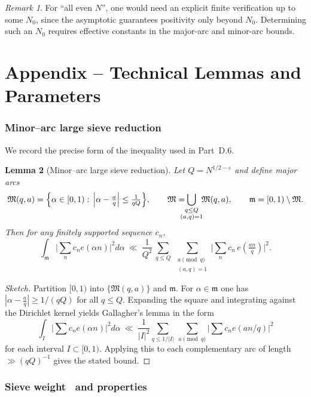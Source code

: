 \documentclass[11pt]{article}
\newtheorem{lemma}{Lemma}[part]
\theoremstyle{definition}
\theoremstyle{remark}
\newtheorem{remark}[lemma]{Remark}
\numberwithin{equation}{part}
\begin{document}
\begin{remark}
	For “all even $N$”, one would need an explicit finite verification up to some $N_0$, since the asymptotic guarantees positivity only beyond $N_0$. Determining such an $N_0$ requires effective constants in the major-arc and minor-arc bounds.
\end{remark}

\part{Appendix -- Technical Lemmas and Parameters}

\section{Minor--arc large sieve reduction}

We record the precise form of the inequality used in Part~D.6.

\begin{lemma}[Minor--arc large sieve reduction]\label{lem:largesieve-minor}
	Let $Q=N^{1/2-\varepsilon}$ and define major arcs
	\[
		\mathfrak M(q,a)=\Bigl\{\alpha\in[0,1):\,\Big|\alpha-\tfrac{a}{q}\Big|\le \tfrac{1}{qQ}\Bigr\},
		\qquad \mathfrak M=\!\!\!\!\!\bigcup_{\substack{q\le Q\\ (a,q)=1}}\!\!\mathfrak M(q,a),
		\qquad \mathfrak m=[0,1)\setminus\mathfrak M.
	\]
	Then for any finitely supported sequence $c_n$,
	\[
		\int_{\mathfrak m}\Big|\sum_{n}c_n e(\alpha n)\Big|^2 d\alpha
		\ \ll\ \frac{1}{Q^2}\,
		\sum_{q\le Q}\ \sum_{\substack{a\!\!\!\pmod q\\ (a,q)=1}}
		\Big|\sum_{n} c_n\,e\!\left(\tfrac{an}{q}\right)\Big|^2.
	\]
\end{lemma}

\begin{proof}[Sketch]
	Partition $[0,1)$ into $\{\mathfrak M(q,a)\}$ and $\mathfrak m$. For $\alpha\in\mathfrak m$ one has
	$|\alpha-\tfrac aq|\ge 1/(qQ)$ for all $q\le Q$. Expanding the square and integrating against the Dirichlet kernel yields Gallagher's lemma in the form
	\[
		\int_{I} \Big|\sum c_n e(\alpha n)\Big|^2 d\alpha
		\ \ll\ \frac{1}{|I|^2}\sum_{q\le 1/|I|}\ \sum_{a\pmod q}\Big|\sum c_n e(an/q)\Big|^2
	\]
	for each interval $I\subset[0,1)$. Applying this to each complementary arc of length $\gg (qQ)^{-1}$ gives the stated bound.
\end{proof}

\section{Sieve weight \textbeta\ and properties}
\end{document}
